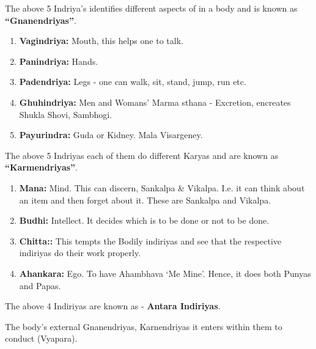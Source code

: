 The above 5 Indriya's identifies different aspects of in a body and is known as \textbf{“Gnanendriyas”}.

\begin{enumerate}
\item \textbf{Vagindriya:} Mouth, this helps one to talk.

 \item \textbf{Panindriya:} Hands.

 \item \textbf{Padendriya:} Legs - one can walk, sit, stand, jump, run etc.

 \item \textbf{Ghuhindriya:} Men and Womans' Marma sthana - Excretion, encreates Shukla Shovi, Sambhogi.

 \item \textbf{Payurindra:} Guda or Kidney. Mala Visargeney.

\end{enumerate}

The above 5 Indriyas each of them do different Karyas and are known as \textbf{“Karmendriyas”}.

\begin{enumerate}
\item \textbf{Mana:} Mind. This can discern, Sankalpa \& Vikalpa. I.e. it can think about an item and then forget about it. These are Sankalpa and Vikalpa.

 \item \textbf{Budhi:} Intellect. It decides which is to be done or not to be done.

 \item \textbf{Chitta::} This tempts the Bodily indiriyas and see that the respective indiriyas do their work properly.

 \item \textbf{Ahankara:} Ego. To have Ahambhava ‘Me Mine’. Hence, it does both Punyas and Papas.

\end{enumerate}

The above 4 Indiriyas are known as - \textbf{Antara Indiriyas}.

The body's external Gnanendriyas, Karnendriyas it enters within them to conduct (Vyapara).


